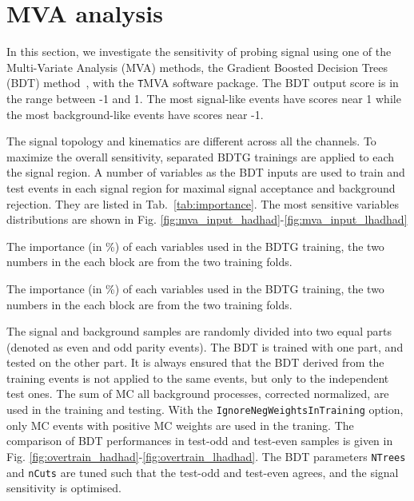 \section{MVA analysis}
\label{sec:mva}

In this section, we investigate the sensitivity of probing signal using one of the Multi-Variate Analysis (MVA) methods, the Gradient Boosted Decision Trees (BDT) method~\cite{BDT,BDT2}, with the {\texttt TMVA} software package. The BDT output score is in the range between -1 and 1. The most signal-like events have scores near 1 while the most background-like events have scores near -1.

The signal topology and kinematics are different across all the channels. To maximize the overall sensitivity, separated BDTG trainings are applied to each the signal region. A number of variables as the BDT inputs are used to train and test events in each signal region for maximal signal acceptance and background rejection. They are listed in Tab.~\ref{tab:importance}. The most sensitive variables distributions are shown in Fig. \ref{fig:mva_input_hadhad}-\ref{fig:mva_input_lhadhad}

\begin{table}
\label{tab:importance}
\caption{The importance (in \%) of each variables used in the BDTG training, the two numbers in the each block are from the two training folds.}

\end{table}


\begin{table}
\label{tab:importance}
\caption{The importance (in \%) of each variables used in the BDTG training, the two numbers in the each block are from the two training folds.}

\end{table}

The signal and background samples are randomly divided into two equal parts (denoted as even and odd parity events). The BDT is trained with one part, and tested on the other part. It is always ensured that the BDT derived from the training events is not applied to the same events, but only to the independent test ones. The sum of MC all background processes, corrected normalized, are used in the training and testing. %
With the \texttt{IgnoreNegWeightsInTraining} option, only MC events with positive MC weights are used in the traning. The comparison of BDT performances in test-odd and test-even samples is given in Fig. \ref{fig:overtrain_hadhad}-\ref{fig:overtrain_lhadhad}. The BDT parameters \texttt{NTrees} and \texttt{nCuts} are tuned such that the test-odd and test-even agrees, and the signal sensitivity is optimised.

